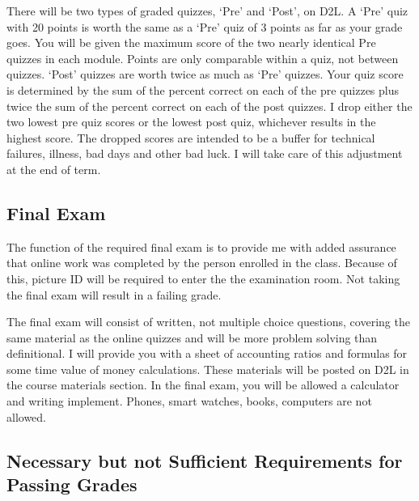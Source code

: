 \documentclass[letterpaper,10pt]{article}
\begin{document}
There will be two types of graded quizzes, `Pre' and `Post', on D2L.  A `Pre'
quiz with 20 points is worth the same as a `Pre' quiz of 3 points as
far as your grade goes.  You will be given the maximum score of the two nearly identical Pre quizzes in each module. Points are only comparable within a quiz, not
between quizzes.  `Post' quizzes are worth twice as much as `Pre' quizzes.
Your quiz score is determined by the sum of the percent correct on each of the pre quizzes plus twice the sum of the percent correct on each of the post quizzes. I drop either the two lowest pre quiz scores or the lowest post quiz, whichever results in the highest score. 
The dropped scores are intended to be a buffer for technical
failures, illness, bad days and other bad luck.  I will take care of this adjustment at the end of term.  

\subsection{Final Exam}


The function of the required final exam is to provide me with added assurance that online work was completed by the person enrolled in the class.  Because of this, picture ID will be required to enter the the examination room.  Not taking the final exam will result in a failing grade.

The final exam will consist of written, not multiple choice questions, covering the same material as the online quizzes and will be more problem solving than definitional. I will provide you with a sheet of accounting ratios and formulas for some time value of money calculations.  These materials will be posted on D2L in the course materials section.  In the final exam, you will be allowed a calculator and writing implement.  Phones, smart watches, books, computers are not allowed.



 \subsection{ Necessary but not Sufficient Requirements for Passing Grades}
 
\end{document}
